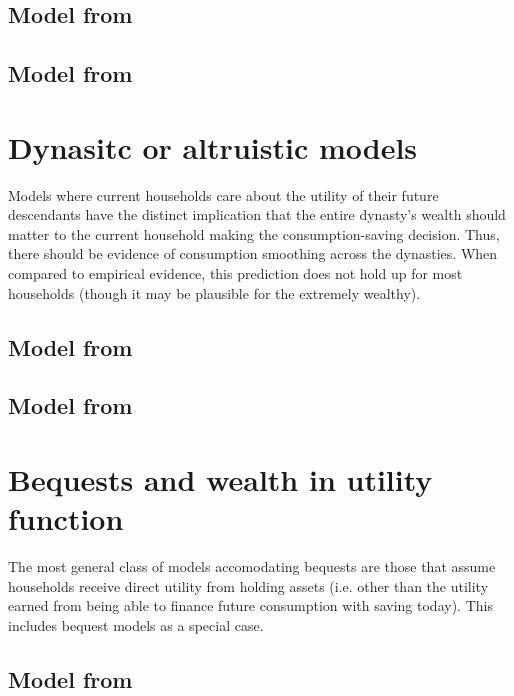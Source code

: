 \documentclass{article}
\begin{document}
\subsection{Model from \cite{Abel1985-ef}}



\subsection{Model from \cite{Cagetti2008-cc}}



\section{Dynasitc or altruistic models}

Models where current households care about the utility of their future descendants have the distinct implication that the entire dynasty's wealth should matter to the current household making the consumption-saving decision. Thus, there should be evidence of consumption smoothing across the dynasties. When compared to empirical evidence, this prediction does not hold up for most households (though it may be plausible for the extremely wealthy).

\subsection{Model from \cite{Barro1974-mp}}



\subsection{Model from \cite{Cagetti2006-pu}}



\section{Bequests and wealth in utility function}

The most general class of models accomodating bequests are those that assume households receive direct utility from holding assets (i.e. other than the utility earned from being able to finance future consumption with saving today). This includes  bequest models as a special case.

\subsection{Model from \cite{Carroll1998-tz}}
\end{document}
